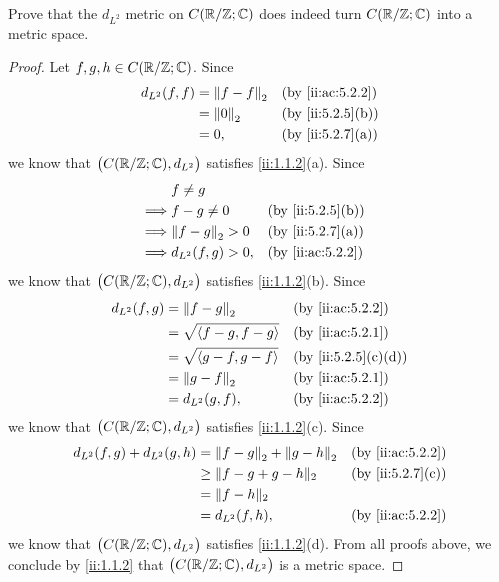 \begin{ex}\label{ii:ex:5.2.4}
  Prove that the \(d_{L^2}\) metric on \(C(\mathbb{R} / \mathbb{Z} ; \mathbb{C})\) does indeed turn \(C(\mathbb{R} / \mathbb{Z} ; \mathbb{C})\) into a metric space.
\end{ex}

\begin{proof}
  Let \(f, g, h \in C(\mathbb{R} / \mathbb{Z} ; \mathbb{C})\).
  Since
  \begin{align*}
    d_{L^2}(f, f) & = \norm*{f - f}_2 &  & \by{ii:ac:5.2.2} \\
                  & = \norm*{0}_2     &  & \by{ii:5.2.5}[b] \\
                  & = 0,              &  & \by{ii:5.2.7}[a]
  \end{align*}
  we know that \(\big(C(\mathbb{R} / \mathbb{Z} ; \mathbb{C}), d_{L^2}\big)\) satisfies \cref{ii:1.1.2}(a).
  Since
  \begin{align*}
             & f \neq g                                  \\
    \implies & f - g \neq 0        &  & \by{ii:5.2.5}[b] \\
    \implies & \norm*{f - g}_2 > 0 &  & \by{ii:5.2.7}[a] \\
    \implies & d_{L^2}(f, g) > 0,  &  & \by{ii:ac:5.2.2}
  \end{align*}
  we know that \(\big(C(\mathbb{R} / \mathbb{Z} ; \mathbb{C}), d_{L^2}\big)\) satisfies \cref{ii:1.1.2}(b).
  Since
  \begin{align*}
    d_{L^2}(f, g) & = \norm*{f - g}_2              &  & \by{ii:ac:5.2.2}   \\
                  & = \sqrt{\inner*{f - g, f - g}} &  & \by{ii:ac:5.2.1}   \\
                  & = \sqrt{\inner*{g - f, g - f}} &  & \by{ii:5.2.5}[c,d] \\
                  & = \norm*{g - f}_2              &  & \by{ii:ac:5.2.1}   \\
                  & = d_{L^2}(g, f),               &  & \by{ii:ac:5.2.2}
  \end{align*}
  we know that \(\big(C(\mathbb{R} / \mathbb{Z} ; \mathbb{C}), d_{L^2}\big)\) satisfies \cref{ii:1.1.2}(c).
  Since
  \begin{align*}
    d_{L^2}(f, g) + d_{L^2}(g, h) & = \norm*{f - g}_2 + \norm*{g - h}_2 &  & \by{ii:ac:5.2.2} \\
                                  & \geq \norm{f - g + g - h}_2         &  & \by{ii:5.2.7}[c] \\
                                  & = \norm{f - h}_2                                          \\
                                  & = d_{L^2}(f, h),                    &  & \by{ii:ac:5.2.2}
  \end{align*}
  we know that \(\big(C(\mathbb{R} / \mathbb{Z} ; \mathbb{C}), d_{L^2}\big)\) satisfies \cref{ii:1.1.2}(d).
  From all proofs above, we conclude by \cref{ii:1.1.2} that \(\big(C(\mathbb{R} / \mathbb{Z} ; \mathbb{C}), d_{L^2}\big)\) is a metric space.
\end{proof}


